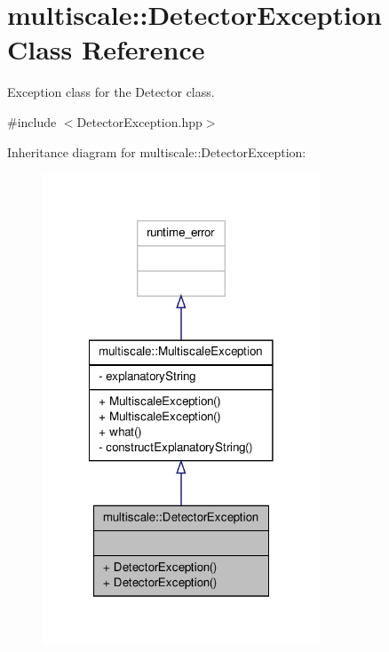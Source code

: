 \hypertarget{classmultiscale_1_1DetectorException}{\section{multiscale\-:\-:Detector\-Exception Class Reference}
\label{classmultiscale_1_1DetectorException}
}


Exception class for the Detector class.  




{\ttfamily \#include $<$Detector\-Exception.\-hpp$>$}



Inheritance diagram for multiscale\-:\-:Detector\-Exception\-:
\nopagebreak
\begin{figure}[H]
\begin{center}
\leavevmode
\includegraphics[width=234pt]{classmultiscale_1_1DetectorException__inherit__graph}
\end{center}
\end{figure}


